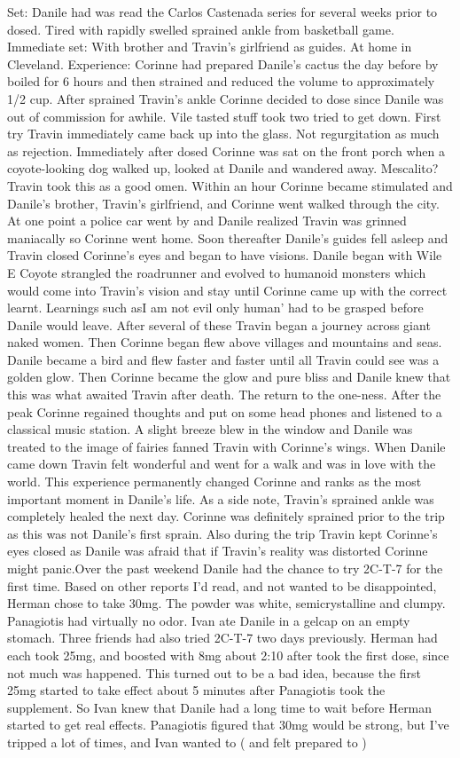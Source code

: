 \documentclass[12pt]{book}
\begin{document}
Set: Danile had was read the Carlos Castenada series for several weeks prior to dosed. Tired with rapidly swelled sprained ankle from basketball game. Immediate set: With brother and Travin's girlfriend as guides. At home in Cleveland. Experience: Corinne had prepared Danile's cactus the day before by boiled for 6 hours and then strained and reduced the volume to approximately 1/2 cup. After sprained Travin's ankle Corinne decided to dose since Danile was out of commission for awhile. Vile tasted stuff took two tried to get down. First try Travin immediately came back up into the glass. Not regurgitation as much as rejection. Immediately after dosed Corinne was sat on the front porch when a coyote-looking dog walked up, looked at Danile and wandered away. Mescalito? Travin took this as a good omen. Within an hour Corinne became stimulated and Danile's brother, Travin's girlfriend, and Corinne went walked through the city. At one point a police car went by and Danile realized Travin was grinned maniacally so Corinne went home. Soon thereafter Danile's guides fell asleep and Travin closed Corinne's eyes and began to have visions. Danile began with Wile E Coyote strangled the roadrunner and evolved to humanoid monsters which would come into Travin's vision and stay until Corinne came up with the correct learnt. Learnings such asI am not evil only human' had to be grasped before Danile would leave. After several of these Travin began a journey across giant naked women. Then Corinne began flew above villages and mountains and seas. Danile became a bird and flew faster and faster until all Travin could see was a golden glow. Then Corinne became the glow and pure bliss and Danile knew that this was what awaited Travin after death. The return to the one-ness. After the peak Corinne regained thoughts and put on some head phones and listened to a classical music station. A slight breeze blew in the window and Danile was treated to the image of fairies fanned Travin with Corinne's wings. When Danile came down Travin felt wonderful and went for a walk and was in love with the world. This experience permanently changed Corinne and ranks as the most important moment in Danile's life. As a side note, Travin's sprained ankle was completely healed the next day. Corinne was definitely sprained prior to the trip as this was not Danile's first sprain. Also during the trip Travin kept Corinne's eyes closed as Danile was afraid that if Travin's reality was distorted Corinne might panic.Over the past weekend Danile had the chance to try 2C-T-7 for the first time. Based on other reports I'd read, and not wanted to be disappointed, Herman chose to take 30mg. The powder was white, semicrystalline and clumpy. Panagiotis had virtually no odor. Ivan ate Danile in a gelcap on an empty stomach. Three friends had also tried 2C-T-7 two days previously. Herman had each took 25mg, and boosted with 8mg about 2:10 after took the first dose, since not much was happened. This turned out to be a bad idea, because the first 25mg started to take effect about 5 minutes after Panagiotis took the supplement. So Ivan knew that Danile had a long time to wait before Herman started to get real effects. Panagiotis figured that 30mg would be strong, but I've tripped a lot of times, and Ivan wanted to ( and felt prepared to ) 
\end{document}

